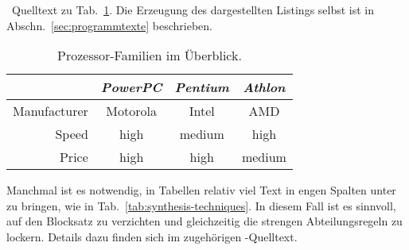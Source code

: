 \begin{program}
\caption{\latex\ Quelltext zu Tab.~\ref{tab:processors}.
Die Erzeugung des dargestellten Listings selbst ist in Abschn.\ \ref{sec:programmtexte} beschrieben.}
\label{prog:processors-source}
%
\begin{LaTeXCode}[numbers=none]
\begin{table}
	\caption{Prozessor-Familien im Überblick.}
	\label{tab:processors}
	\centering
	\setlength{\tabcolsep}{5mm}	%
	\def\arraystretch{1.25}		%
	\begin{tabular}{|r||c|c|c|} 
		\hline
		& \emph{PowerPC} & \emph{Pentium} & \emph{Athlon} \\
		\hline
		\hline
		Manufacturer & Motorola & Intel & AMD \\
		\hline
		Speed & high & medium & high \\
		\hline
		Price & high & high & medium \\
		\hline
	\end{tabular}
\end{table}
\end{LaTeXCode}
%
\end{program}

Manchmal ist es notwendig, in Tabellen relativ viel Text in engen Spalten
unter zu bringen, wie in Tab.~\ref{tab:synthesis-techniques}. In diesem Fall
ist es sinnvoll, auf den Blocksatz zu verzichten und gleichzeitig die
strengen Abteilungsregeln zu lockern. Details dazu finden sich im zugehörigen
\latex-Quelltext.


